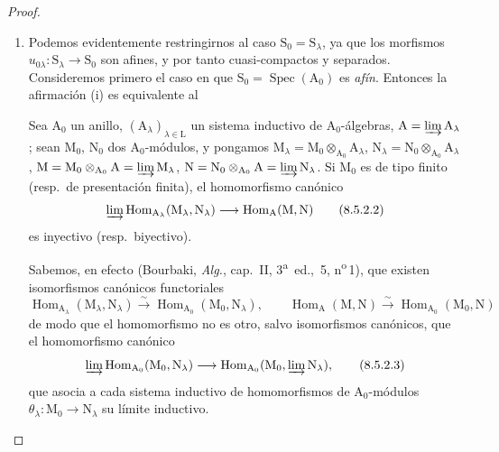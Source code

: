 \begin{proof}
\begin{enumerate}[label=(\roman*)]
  \item Podemos evidentemente restringirnos al caso $\mathrm{S}_0=\mathrm{S}_\lambda$, ya que los morfismos $u_{0\lambda}:\mathrm{S}_\lambda\to\mathrm{S}_0$ son afines, y por tanto cuasi-compactos y separados.
Consideremos primero el caso en que $\mathrm{S}_0=\operatorname{Spec}(\mathrm{A}_0)$ es \emph{afín}.
Entonces la afirmación (i) es equivalente al

\begin{lemma}[8.5.2.1]
\label{IV.8.5.2.1}
Sea $\mathrm{A}_0$ un anillo, $(\mathrm{A}_\lambda)_{\lambda\in\mathrm{L}}$ un sistema inductivo de $\mathrm{A}_0$-álgebras, $\mathrm{A}=\varinjlim\mathrm{A}_\lambda$; sean $\mathrm{M}_0$, $\mathrm{N}_0$ dos $\mathrm{A}_0$-módulos, y pongamos $\mathrm{M}_\lambda=\mathrm{M}_0\otimes_{\mathrm{A}_0}\mathrm{A}_\lambda$, $\mathrm{N}_\lambda=\mathrm{N}_0\otimes_{\mathrm{A}_0}\mathrm{A}_\lambda$, $\mathrm{M}=\mathrm{M}_0\otimes_{\mathrm{A}_0}\mathrm{A}=\varinjlim\mathrm{M}_\lambda$, $\mathrm{N}=\mathrm{N}_0\otimes_{\mathrm{A}_0}\mathrm{A}=\varinjlim\mathrm{N}_\lambda$.
Si $\mathrm{M}_0$ es de tipo finito (resp.\ de presentación finita), el homomorfismo canónico
\begin{equation}
  \varinjlim\operatorname{Hom}_{\mathrm{A}_\lambda}(\mathrm{M}_\lambda,\mathrm{N}_\lambda)\to\operatorname{Hom}_\mathrm{A}(\mathrm{M},\mathrm{N})
  \tag{8.5.2.2}
\label{IV.8.5.2.2}
\end{equation}
es inyectivo (resp.\ biyectivo).
\end{lemma}

Sabemos, en efecto (Bourbaki, \emph{Alg.}, cap.~II, 3\textsuperscript{a}~ed., \textsection\,5, n\textsuperscript{o}\,1), que existen isomorfismos canónicos functoriales
\[
  \operatorname{Hom}_{\mathrm{A}_\lambda}(\mathrm{M}_\lambda,\mathrm{N}_\lambda)\xrightarrow{\sim}\operatorname{Hom}_{\mathrm{A}_0}(\mathrm{M}_0,\mathrm{N}_\lambda),\qquad\operatorname{Hom}_\mathrm{A}(\mathrm{M},\mathrm{N})\xrightarrow{\sim}\operatorname{Hom}_{\mathrm{A}_0}(\mathrm{M}_0,\mathrm{N})
\]
de modo que el homomorfismo  no es otro, salvo isomorfismos canónicos, que el homomorfismo canónico
\begin{equation}
  \varinjlim\operatorname{Hom}_{\mathrm{A}_0}(\mathrm{M}_0,\mathrm{N}_\lambda)\to\operatorname{Hom}_{\mathrm{A}_0}(\mathrm{M}_0,\varinjlim\mathrm{N}_\lambda),
  \tag{8.5.2.3}
\label{IV.8.5.2.3}
\end{equation}
que asocia a cada sistema inductivo de homomorfismos de $\mathrm{A}_0$-módulos $\theta_\lambda:\mathrm{M}_0\to\mathrm{N}_\lambda$ su límite inductivo.


\end{enumerate}
\end{proof}
